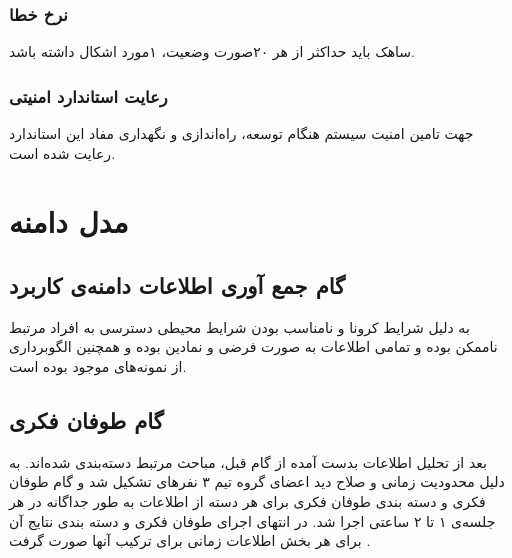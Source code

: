 \documentclass[oneside,a4paper,12pt]{book}
\begin{document}
	\subsection{نرخ خطا}
	\noindent
	ساهک باید حداکثر از هر ۲۰صورت وضعیت، ۱مورد اشکال داشته باشد.
	
	
	\subsection{رعایت استاندارد امنیتی }
	جهت تامین امنیت سیستم هنگام توسعه، راه‌اندازی و نگهداری مفاد این استاندارد رعایت شده است.
	
	
	\chapter{مدل دامنه}
	\section{گام جمع آوری اطلاعات دامنه‌ی کاربرد}
	به دلیل شرایط کرونا و نامناسب بودن شرایط محیطی دسترسی به افراد مرتبط ناممکن بوده و تمامی اطلاعات به صورت فرضی و نمادین بوده و همچنین الگوبرداری از نمونه‌های موجود بوده است.
	
	\section{گام طوفان فکری}
	بعد از تحلیل اطلاعات بدست آمده از گام قبل، مباحث مرتبط دسته‌بندی شده‌اند. به دلیل محدودیت زمانی و صلاح دید اعضای گروه تیم ۳ نفرهای تشکیل شد و گام طوفان فکری و دسته بندی طوفان فکری برای هر دسته از اطلاعات به طور جداگانه در هر جلسه‌ی ۱ تا ۲ ساعتی اجرا شد. در انتهای اجرای طوفان فکری و دسته بندی نتایج آن برای هر بخش اطلاعات زمانی برای ترکیب آنها صورت گرفت .

	\vspace{6cm}
\end{document}
